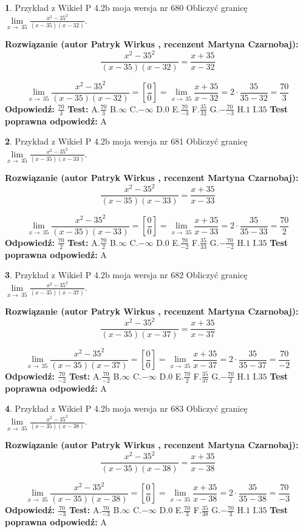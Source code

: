 \documentclass[12pt, a4paper]{article}
\theoremstyle{definition} %
\newtheorem{zad}{}
\newcommand{\zadStart}[1]{\begin{zad}#1\newline}
\newcommand{\zadStop}{\end{zad}}
\newcommand{\rozwStart}[2]{\noindent \textbf{Rozwiązanie (autor #1 , recenzent #2): }\newline}
\newcommand{\rozwStop}{\newline}
\newcommand{\odpStart}{\noindent \textbf{Odpowiedź:}\newline}
\newcommand{\odpStop}{\newline}
\newcommand{\testStart}{\noindent \textbf{Test:}\newline}
\newcommand{\testStop}{\newline}
\newcommand{\kluczStart}{\noindent \textbf{Test poprawna odpowiedź:}\newline}
\newcommand{\kluczStop}{\newline}
\begin{document}
\zadStart{Przykład z Wikieł P 4.2b moja wersja nr 680}
Obliczyć granicę $\lim\limits_{x\to\ 35}\frac{x^{2}-35^{2}}{(x-35)(x-32)}$.
\zadStop
\rozwStart{Patryk Wirkus}{Martyna Czarnobaj}
$$\frac{x^{2}-35^{2}}{(x-35)(x-32)}=\frac{x+35}{x-32}$$

$$\lim\limits_{x\to\ 35}\frac{x^{2}-35^{2}}{(x-35)(x-32)}=[\frac{0}{0}]=\lim\limits_{x\to\ 35}\frac{x+35}{x-32}=2 \cdot \frac{35}{35-32} = \frac{70}{3}$$
\rozwStop
\odpStart
$\frac{70}{3}$
\odpStop
\testStart
A.$\frac{70}{3}$
B.$\infty$
C.$-\infty$
D.$0$
E.$\frac{70}{-3}$
F.$\frac{35}{32}$
G.$-\frac{70}{-3}$
H.$1$
I.$35$
\testStop
\kluczStart
A
\kluczStop



\zadStart{Przykład z Wikieł P 4.2b moja wersja nr 681}
Obliczyć granicę $\lim\limits_{x\to\ 35}\frac{x^{2}-35^{2}}{(x-35)(x-33)}$.
\zadStop
\rozwStart{Patryk Wirkus}{Martyna Czarnobaj}
$$\frac{x^{2}-35^{2}}{(x-35)(x-33)}=\frac{x+35}{x-33}$$

$$\lim\limits_{x\to\ 35}\frac{x^{2}-35^{2}}{(x-35)(x-33)}=[\frac{0}{0}]=\lim\limits_{x\to\ 35}\frac{x+35}{x-33}=2 \cdot \frac{35}{35-33} = \frac{70}{2}$$
\rozwStop
\odpStart
$\frac{70}{2}$
\odpStop
\testStart
A.$\frac{70}{2}$
B.$\infty$
C.$-\infty$
D.$0$
E.$\frac{70}{-2}$
F.$\frac{35}{33}$
G.$-\frac{70}{-2}$
H.$1$
I.$35$
\testStop
\kluczStart
A
\kluczStop



\zadStart{Przykład z Wikieł P 4.2b moja wersja nr 682}
Obliczyć granicę $\lim\limits_{x\to\ 35}\frac{x^{2}-35^{2}}{(x-35)(x-37)}$.
\zadStop
\rozwStart{Patryk Wirkus}{Martyna Czarnobaj}
$$\frac{x^{2}-35^{2}}{(x-35)(x-37)}=\frac{x+35}{x-37}$$

$$\lim\limits_{x\to\ 35}\frac{x^{2}-35^{2}}{(x-35)(x-37)}=[\frac{0}{0}]=\lim\limits_{x\to\ 35}\frac{x+35}{x-37}=2 \cdot \frac{35}{35-37} = \frac{70}{-2}$$
\rozwStop
\odpStart
$\frac{70}{-2}$
\odpStop
\testStart
A.$\frac{70}{-2}$
B.$\infty$
C.$-\infty$
D.$0$
E.$\frac{70}{2}$
F.$\frac{35}{37}$
G.$-\frac{70}{2}$
H.$1$
I.$35$
\testStop
\kluczStart
A
\kluczStop



\zadStart{Przykład z Wikieł P 4.2b moja wersja nr 683}
Obliczyć granicę $\lim\limits_{x\to\ 35}\frac{x^{2}-35^{2}}{(x-35)(x-38)}$.
\zadStop
\rozwStart{Patryk Wirkus}{Martyna Czarnobaj}
$$\frac{x^{2}-35^{2}}{(x-35)(x-38)}=\frac{x+35}{x-38}$$

$$\lim\limits_{x\to\ 35}\frac{x^{2}-35^{2}}{(x-35)(x-38)}=[\frac{0}{0}]=\lim\limits_{x\to\ 35}\frac{x+35}{x-38}=2 \cdot \frac{35}{35-38} = \frac{70}{-3}$$
\rozwStop
\odpStart
$\frac{70}{-3}$
\odpStop
\testStart
A.$\frac{70}{-3}$
B.$\infty$
C.$-\infty$
D.$0$
E.$\frac{70}{3}$
F.$\frac{35}{38}$
G.$-\frac{70}{3}$
H.$1$
I.$35$
\testStop
\kluczStart
A
\kluczStop
\end{document}
